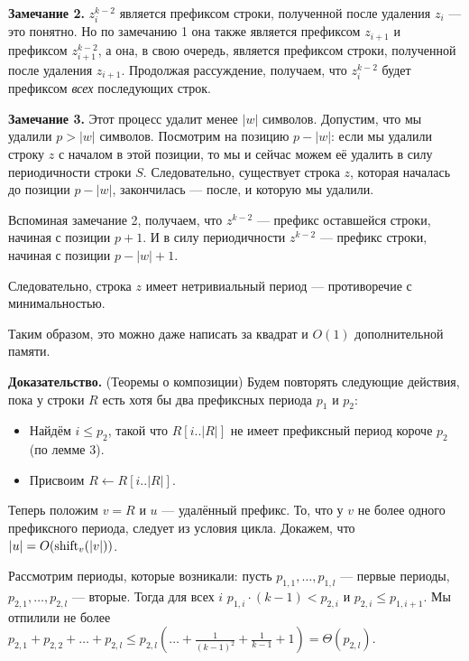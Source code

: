 \textbf{Замечание 2.} $z_i^{k-2}$ является префиксом строки, полученной после удаления $z_i$ --- это понятно.
Но по замечанию 1 она также является префиксом $z_{i+1}$ и префиксом $z_{i+1}^{k-2}$, а она, в свою очередь, является префиксом строки, полученной после удаления $z_{i+1}$.
Продолжая рассуждение, получаем, что $z_i^{k-2}$ будет префиксом \textit{всех} последующих строк.

\textbf{Замечание 3.} Этот процесс удалит менее $|w|$ символов.
Допустим, что мы удалили $p > |w|$ символов.
Посмотрим на позицию $p - |w|$: если мы удалили строку $z$ с началом в этой позиции, то мы и сейчас можем её удалить в силу периодичности строки $S$.
Следовательно, существует строка $z$, которая началась до позиции $p - |w|$, закончилась --- после, и которую мы удалили.

\begin{figure}[ht]
    \centering
\end{figure}

Вспоминая замечание 2, получаем, что $z^{k-2}$ --- префикс оставшейся строки, начиная с позиции $p + 1$.
И в силу периодичности $z^{k-2}$ --- префикс строки, начиная с позиции $p - |w| + 1$.

\begin{figure}[ht]
    \centering
\end{figure}

Следовательно, строка $z$ имеет нетривиальный период --- противоречие с минимальностью.

Таким образом, это можно даже написать за квадрат и $O(1)$ дополнительной памяти.

\textbf{Доказательство.} (Теоремы о композиции)
Будем повторять следующие действия, пока у строки $R$ есть хотя бы два префиксных периода $p_1$ и $p_2$:
\begin{itemize}
    \item Найдём $i \le p_2$, такой что $R[i..|R|]$ не имеет префиксный период короче $p_2$ (по лемме 3).
    \item Присвоим $R \leftarrow R[i..|R|]$.
\end{itemize}
Теперь положим $v = R$ и $u$ --- удалённый префикс.
То, что у $v$ не более одного префиксного периода, следует из условия цикла.
Докажем, что $|u| = O(\operatorname{shift}_v(|v|))$.

Рассмотрим периоды, которые возникали: пусть $p_{1,1}, \dots, p_{1,l}$ --- первые периоды, $p_{2,1}, \dots, p_{2,l}$ --- вторые.
Тогда для всех $i$ $p_{1,i} \cdot (k - 1) < p_{2,i}$ и $p_{2,i} \le p_{1,i+1}$.
Мы отпилили не более $p_{2,1} + p_{2,2} + \dots + p_{2,l} \le p_{2,l} \left( \dots + \frac{1}{(k-1)^2} + \frac{1}{k-1} + 1 \right) = \Theta(p_{2,l})$.


